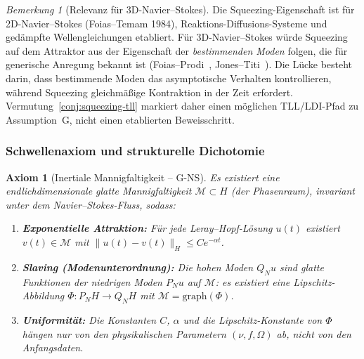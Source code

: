\documentclass[12pt,a4paper]{article}
\theoremstyle{definition}
\theoremstyle{plain}
\newtheorem{axiom}[definition]{Axiom}
\theoremstyle{remark}
\newtheorem{remark}[definition]{Bemerkung}
\begin{document}
\begin{remark}[Relevanz f\"ur 3D-Navier--Stokes]\label{rem:squeezing-ns}
Die Squeezing-Eigenschaft ist f\"ur 2D-Navier--Stokes (Foias--Temam 1984), Reaktions-Diffusions-Systeme und ged\"ampfte Wellengleichungen etabliert. F\"ur 3D-Navier--Stokes w\"urde Squeezing auf dem Attraktor aus der Eigenschaft der \emph{bestimmenden Moden} folgen, die f\"ur generische Anregung bekannt ist (Foias--Prodi~\cite{FoiasProdi1967}, Jones--Titi~\cite{JonesTiti1992}). Die L\"ucke besteht darin, dass bestimmende Moden das asymptotische Verhalten kontrollieren, w\"ahrend Squeezing gleichm\"a\ss ige Kontraktion in der Zeit erfordert. Vermutung~\ref{conj:squeezing-tll} markiert daher einen m\"oglichen TLL/LDI-Pfad zu Assumption~G, nicht einen etablierten Beweisschritt.
\end{remark}

\subsubsection*{Schwellenaxiom und strukturelle Dichotomie}

\begin{axiom}[Inertiale Mannigfaltigkeit -- G-NS]\label{ax:g-ns}
Es existiert eine endlichdimensionale glatte Mannigfaltigkeit $\mathcal{M} \subset H$ (der Phasenraum), invariant unter dem Navier--Stokes-Fluss, sodass:
\begin{enumerate}
\item[(G1)] \textbf{Exponentielle Attraktion:} F\"ur jede Leray--Hopf-L\"osung $u(t)$ existiert $v(t) \in \mathcal{M}$ mit $\|u(t) - v(t)\|_H \leq C e^{-\alpha t}$.
\item[(G2)] \textbf{Slaving (Modenunterordnung):} Die hohen Moden $Q_N u$ sind glatte Funktionen der niedrigen Moden $P_N u$ auf $\mathcal{M}$: es existiert eine Lipschitz-Abbildung $\Phi: P_N H \to Q_N H$ mit $\mathcal{M} = \mathrm{graph}(\Phi)$.
\item[(G3)] \textbf{Uniformit\"at:} Die Konstanten $C$, $\alpha$ und die Lipschitz-Konstante von $\Phi$ h\"angen nur von den physikalischen Parametern $(\nu, f, \Omega)$ ab, nicht von den Anfangsdaten.
\end{enumerate}
\end{axiom}
\end{document}
